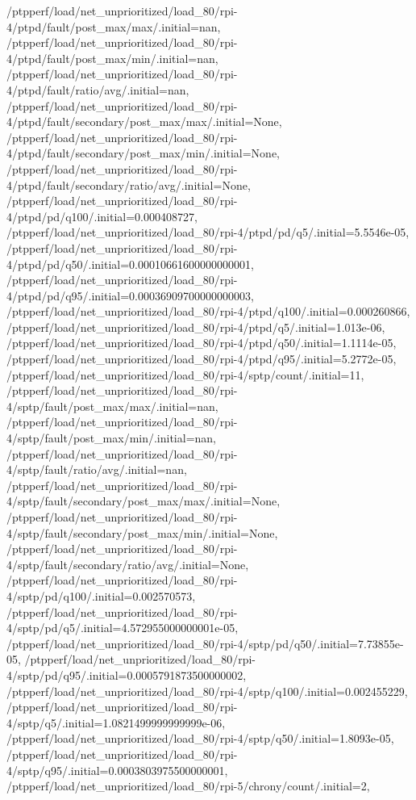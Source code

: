 {    /ptpperf/load/net_unprioritized/load_80/rpi-4/ptpd/fault/post_max/max/.initial=nan,
    /ptpperf/load/net_unprioritized/load_80/rpi-4/ptpd/fault/post_max/min/.initial=nan,
    /ptpperf/load/net_unprioritized/load_80/rpi-4/ptpd/fault/ratio/avg/.initial=nan,
    /ptpperf/load/net_unprioritized/load_80/rpi-4/ptpd/fault/secondary/post_max/max/.initial=None,
    /ptpperf/load/net_unprioritized/load_80/rpi-4/ptpd/fault/secondary/post_max/min/.initial=None,
    /ptpperf/load/net_unprioritized/load_80/rpi-4/ptpd/fault/secondary/ratio/avg/.initial=None,
    /ptpperf/load/net_unprioritized/load_80/rpi-4/ptpd/pd/q100/.initial=0.000408727,
    /ptpperf/load/net_unprioritized/load_80/rpi-4/ptpd/pd/q5/.initial=5.5546e-05,
    /ptpperf/load/net_unprioritized/load_80/rpi-4/ptpd/pd/q50/.initial=0.00010661600000000001,
    /ptpperf/load/net_unprioritized/load_80/rpi-4/ptpd/pd/q95/.initial=0.00036909700000000003,
    /ptpperf/load/net_unprioritized/load_80/rpi-4/ptpd/q100/.initial=0.000260866,
    /ptpperf/load/net_unprioritized/load_80/rpi-4/ptpd/q5/.initial=1.013e-06,
    /ptpperf/load/net_unprioritized/load_80/rpi-4/ptpd/q50/.initial=1.1114e-05,
    /ptpperf/load/net_unprioritized/load_80/rpi-4/ptpd/q95/.initial=5.2772e-05,
    /ptpperf/load/net_unprioritized/load_80/rpi-4/sptp/count/.initial=11,
    /ptpperf/load/net_unprioritized/load_80/rpi-4/sptp/fault/post_max/max/.initial=nan,
    /ptpperf/load/net_unprioritized/load_80/rpi-4/sptp/fault/post_max/min/.initial=nan,
    /ptpperf/load/net_unprioritized/load_80/rpi-4/sptp/fault/ratio/avg/.initial=nan,
    /ptpperf/load/net_unprioritized/load_80/rpi-4/sptp/fault/secondary/post_max/max/.initial=None,
    /ptpperf/load/net_unprioritized/load_80/rpi-4/sptp/fault/secondary/post_max/min/.initial=None,
    /ptpperf/load/net_unprioritized/load_80/rpi-4/sptp/fault/secondary/ratio/avg/.initial=None,
    /ptpperf/load/net_unprioritized/load_80/rpi-4/sptp/pd/q100/.initial=0.002570573,
    /ptpperf/load/net_unprioritized/load_80/rpi-4/sptp/pd/q5/.initial=4.572955000000001e-05,
    /ptpperf/load/net_unprioritized/load_80/rpi-4/sptp/pd/q50/.initial=7.73855e-05,
    /ptpperf/load/net_unprioritized/load_80/rpi-4/sptp/pd/q95/.initial=0.0005791873500000002,
    /ptpperf/load/net_unprioritized/load_80/rpi-4/sptp/q100/.initial=0.002455229,
    /ptpperf/load/net_unprioritized/load_80/rpi-4/sptp/q5/.initial=1.0821499999999999e-06,
    /ptpperf/load/net_unprioritized/load_80/rpi-4/sptp/q50/.initial=1.8093e-05,
    /ptpperf/load/net_unprioritized/load_80/rpi-4/sptp/q95/.initial=0.0003803975500000001,
    /ptpperf/load/net_unprioritized/load_80/rpi-5/chrony/count/.initial=2,
}
